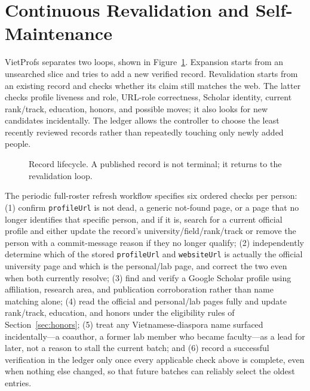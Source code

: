 \documentclass[11pt]{article}
\newcommand{\code}[1]{\texttt{\small #1}}
\begin{document}
\section{Continuous Revalidation and Self-Maintenance}
\label{sec:maintenance}
VietProfs separates two loops, shown in Figure~\ref{fig:lifecycle}.
Expansion starts from an unsearched slice and tries to add a new verified record.
Revalidation starts from an existing record and checks whether its claim still matches the web.
The latter checks profile liveness and role, URL-role correctness, Scholar identity, current rank/track, education, honors, and possible moves; it also looks for new candidates incidentally.
The ledger allows the controller to choose the least recently reviewed records rather than repeatedly touching only newly added people.

\begin{figure}[t]
\centering

\caption{Record lifecycle. A published record is not terminal; it returns to the revalidation loop.}
\label{fig:lifecycle}
\end{figure}

The periodic full-roster refresh workflow specifies six ordered checks per person: (1) confirm \code{profileUrl} is not dead, a generic not-found page, or a page that no longer identifies that specific person, and if it is, search for a current official profile and either update the record's university/field/rank/track or remove the person with a commit-message reason if they no longer qualify; (2) independently determine which of the stored \code{profileUrl} and \code{websiteUrl} is actually the official university page and which is the personal/lab page, and correct the two even when both currently resolve; (3) find and verify a Google Scholar profile using affiliation, research area, and publication corroboration rather than name matching alone; (4) read the official and personal/lab pages fully and update rank/track, education, and honors under the eligibility rules of Section~\ref{sec:honors}; (5) treat any Vietnamese-diaspora name surfaced incidentally---a coauthor, a former lab member who became faculty---as a lead for later, not a reason to stall the current batch; and (6) record a successful verification in the ledger only once every applicable check above is complete, even when nothing else changed, so that future batches can reliably select the oldest entries.
\end{document}
